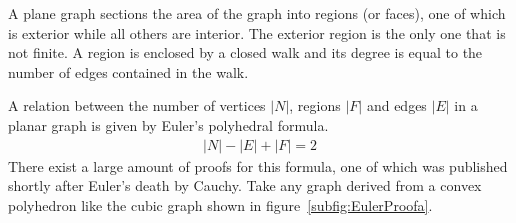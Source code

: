 A plane graph sections the area of the graph into regions (or faces), one of
which is exterior while all others are interior. The exterior region is the only
one that is not finite. A region is enclosed by a closed walk and its degree is
equal to the number of edges contained in the walk. 

A relation between the number of vertices $|N|$, regions $|F|$ and edges $|E|$ in a
planar graph is given by Euler's polyhedral formula.
%
\begin{align}
    |N|-|E|+|F|=2\label{eqn:Euler}
\end{align}
%
There exist a large amount of proofs for this formula, one of which was
published shortly after Euler's death by
Cauchy.\autocite{Patterson_AspectsEulerTheorem_1977} Take any graph derived from
a convex polyhedron like the cubic graph shown in
figure~\ref{subfig:EulerProofa}.
%
